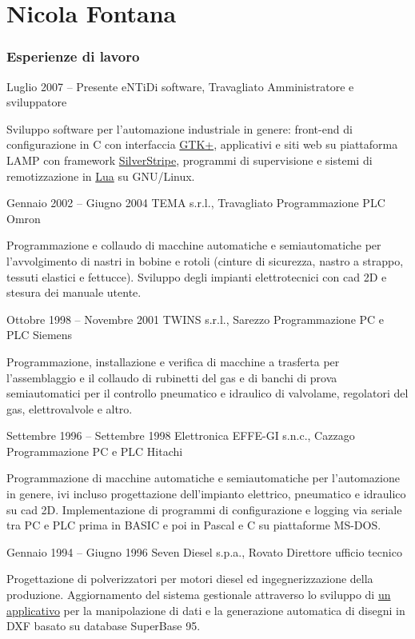 \documentclass[fontsize=10pt]{tccv}
\begin{document}
\part{Nicola Fontana}

\section{Esperienze di lavoro}

\begin{eventlist}

\item{Luglio 2007 -- Presente}
     {eNTiDi software, Travagliato}
     {Amministratore e sviluppatore}

Sviluppo software per l'automazione industriale in genere:
front-end di configurazione in C con interfaccia
\href{http://www.gtk.org/}{GTK+}, applicativi e siti web su piattaforma
LAMP con framework \href{http://www.silverstripe.org/}{SilverStripe},
programmi di supervisione e sistemi di remotizzazione in
\href{http://www.lua.org/}{Lua} su GNU/Linux.

\item{Gennaio 2002 -- Giugno 2004}
     {TEMA s.r.l., Travagliato}
     {Programmazione PLC Omron}

Programmazione e collaudo di macchine automatiche e
semiautomatiche per l'avvolgimento di nastri in bobine e rotoli (cinture
di sicurezza, nastro a strappo, tessuti elastici e fettucce). Sviluppo
degli impianti elettrotecnici con cad 2D e stesura dei manuale
utente.

\item{Ottobre 1998 -- Novembre 2001}
     {TWINS s.r.l., Sarezzo}
     {Programmazione PC e PLC Siemens}

Programmazione, installazione e verifica di macchine a
trasferta per l'assemblaggio e il collaudo di rubinetti del gas e di
banchi di prova semiautomatici per il controllo pneumatico e idraulico
di valvolame, regolatori del gas, elettrovalvole e altro.

\item{Settembre 1996 -- Settembre 1998}
     {Elettronica EFFE-GI s.n.c., Cazzago}
     {Programmazione PC e PLC Hitachi}

Programmazione di macchine automatiche e semiautomatiche per
l'automazione in genere, ivi incluso progettazione dell'impianto
elettrico, pneumatico e idraulico su cad 2D. Implementazione di
programmi di configurazione e logging via seriale tra PC e PLC prima in
BASIC e poi in Pascal e C su piattaforme MS-DOS.

\item{Gennaio 1994 -- Giugno 1996}
     {Seven Diesel s.p.a., Rovato}
     {Direttore ufficio tecnico}

Progettazione di polverizzatori per motori diesel ed ingegnerizzazione
della produzione. Aggiornamento del sistema gestionale attraverso lo
sviluppo di \href{http://adg.entidi.com/home/history/}{un applicativo}
per la manipolazione di dati e la generazione automatica di disegni in
DXF basato su database SuperBase 95.

\end{eventlist}
\end{document}
